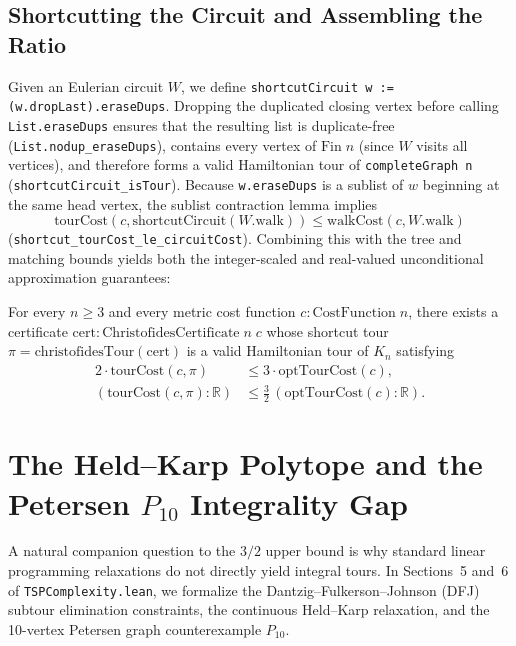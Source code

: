 \subsection{Shortcutting the Circuit and Assembling the Ratio}

Given an Eulerian circuit $W$, we define \texttt{shortcutCircuit w := (w.dropLast).eraseDups}. Dropping the duplicated closing vertex before calling \texttt{List.eraseDups} ensures that the resulting list is duplicate-free (\texttt{List.nodup\_eraseDups}), contains every vertex of $\mathrm{Fin}\;n$ (since $W$ visits all vertices), and therefore forms a valid Hamiltonian tour of \texttt{completeGraph n} (\texttt{shortcutCircuit\_isTour}). Because \texttt{w.eraseDups} is a sublist of $w$ beginning at the same head vertex, the sublist contraction lemma implies
\[
  \mathrm{tourCost}(c, \mathrm{shortcutCircuit}(W.\mathrm{walk})) \le \mathrm{walkCost}(c, W.\mathrm{walk})
\]
(\texttt{shortcut\_tourCost\_le\_circuitCost}). Combining this with the tree and matching bounds yields both the integer-scaled and real-valued unconditional approximation guarantees:
\begin{theorem}
For every $n \ge 3$ and every metric cost function $c : \mathrm{CostFunction}\;n$, there exists a certificate $\mathrm{cert} : \mathrm{ChristofidesCertificate}\;n\;c$ whose shortcut tour $\pi = \mathrm{christofidesTour}(\mathrm{cert})$ is a valid Hamiltonian tour of $K_n$ satisfying
\[
\begin{aligned}
  2 \cdot \mathrm{tourCost}(c, \pi) &\le 3 \cdot \mathrm{optTourCost}(c), \\
  (\mathrm{tourCost}(c, \pi) : \mathbb{R}) &\le \frac{3}{2}\,(\mathrm{optTourCost}(c) : \mathbb{R}).
\end{aligned}
\]
\end{theorem}

\section{The Held--Karp Polytope and the Petersen \texorpdfstring{$P_{10}$}{P10} Integrality Gap}
\label{sec:polyhedral}

A natural companion question to the $3/2$ upper bound is why standard linear programming relaxations do not directly yield integral tours. In Sections~5 and~6 of \texttt{TSPComplexity.lean}, we formalize the Dantzig--Fulkerson--Johnson (DFJ) subtour elimination constraints, the continuous Held--Karp relaxation, and the 10-vertex Petersen graph counterexample $P_{10}$.

